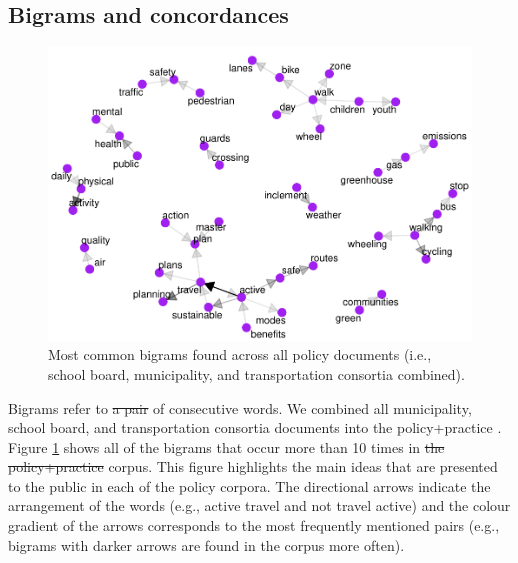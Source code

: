 \documentclass[preprint, 3p,
authoryear]{elsarticle} %
\providecommand{\DIFaddtex}[1]{{\protect\color{blue}\uwave{#1}}} %
\providecommand{\DIFdeltex}[1]{{\protect\color{red}\sout{#1}}}                      %
\providecommand{\DIFaddbegin}{} %
\providecommand{\DIFaddend}{} %
\providecommand{\DIFdelbegin}{} %
\providecommand{\DIFdelend}{} %
\providecommand{\DIFadd}[1]{\texorpdfstring{\DIFaddtex{#1}}{#1}} %
\providecommand{\DIFdel}[1]{\texorpdfstring{\DIFdeltex{#1}}{}} %
\newcommand{\DIFscaledelfig}{0.5}
\newlength{\DIFdelgraphicswidth} %
\newlength{\DIFdelgraphicsheight} %
\newcommand{\DIFaddincludegraphics}[2][]{{\color{blue}\fbox{\DIFOincludegraphics[#1]{#2}}}} %
\newcommand{\DIFdelincludegraphics}[2][]{%
\sbox{\DIFdelgraphicsbox}{\DIFOincludegraphics[#1]{#2}}%
\settoboxwidth{\DIFdelgraphicswidth}{\DIFdelgraphicsbox} %
\settoboxtotalheight{\DIFdelgraphicsheight}{\DIFdelgraphicsbox} %
\scalebox{\DIFscaledelfig}{%
\parbox[b]{\DIFdelgraphicswidth}{\usebox{\DIFdelgraphicsbox}\\[-\baselineskip] \rule{\DIFdelgraphicswidth}{0em}}\llap{\resizebox{\DIFdelgraphicswidth}{\DIFdelgraphicsheight}{%
\setlength{\unitlength}{\DIFdelgraphicswidth}%
\begin{picture}(1,1)%
\thicklines\linethickness{2pt} %
{\color[rgb]{1,0,0}\put(0,0){\framebox(1,1){}}}%
{\color[rgb]{1,0,0}\put(0,0){\line( 1,1){1}}}%
{\color[rgb]{1,0,0}\put(0,1){\line(1,-1){1}}}%
\end{picture}%
}\hspace*{3pt}}} %
} %
\DeclareRobustCommand{\DIFaddbegin}{\DIFOaddbegin \let\includegraphics\DIFaddincludegraphics} %
\DeclareRobustCommand{\DIFaddend}{\DIFOaddend \let\includegraphics\DIFOincludegraphics} %
\DeclareRobustCommand{\DIFdelbegin}{\DIFOdelbegin \let\includegraphics\DIFdelincludegraphics} %
\DeclareRobustCommand{\DIFdelend}{\DIFOaddend \let\includegraphics\DIFOincludegraphics} %
\begin{document}
\hypertarget{bigrams-and-concordances}{%
\subsection{Bigrams and concordances}\label{bigrams-and-concordances}}

\begin{figure}

{\centering \includegraphics[width=1\linewidth]{AST-Framing-Ontario_files/figure-latex/policy-visual-1} 

}

\caption{\label{fig:policy-visual}Most common bigrams found across all policy documents (i.e., school board, municipality, and transportation consortia combined).}\label{fig:policy-visual}
\end{figure}

Bigrams refer to \DIFdelbegin \DIFdel{a pair }\DIFdelend \DIFaddbegin \DIFadd{pairs }\DIFaddend of consecutive words. We combined all
municipality, school board, and transportation consortia documents into
the policy+practice \DIFaddbegin \DIFadd{corpus}\DIFaddend . Figure \ref{fig:policy-visual} shows all of
the bigrams that occur more than 10 times in \DIFdelbegin \DIFdel{the policy+practice }\DIFdelend \DIFaddbegin \DIFadd{this }\DIFaddend corpus. This figure
highlights the main ideas that are presented to the public in each of
the policy corpora. The directional arrows indicate the arrangement of
the words (e.g., active travel and not travel active) and the colour
gradient of the arrows corresponds to the most frequently mentioned
pairs (e.g., bigrams with darker arrows are found in the corpus more
often).
\end{document}
